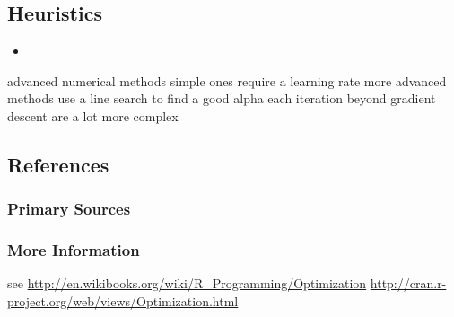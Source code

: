 \begin{bibunit}
\subsection{Heuristics}

\begin{itemize}
	\item 
\end{itemize}


advanced numerical methods
simple ones require a learning rate
more advanced methods use a line search to find a good alpha each iteration
beyond gradient descent are a lot more complex



\subsection{References}

\subsubsection{Primary Sources}


\subsubsection{More Information}


see
\url{http://en.wikibooks.org/wiki/R_Programming/Optimization}
\url{http://cran.r-project.org/web/views/Optimization.html}


\putbib
\end{bibunit}

